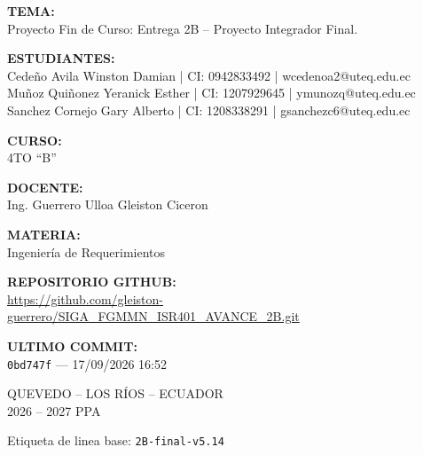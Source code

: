 \documentclass[12pt,a4paper]{article}
\begin{document}
\textbf{TEMA:}\\
Proyecto Fin de Curso: Entrega 2B -- Proyecto Integrador Final.

\bigskip
\textbf{ESTUDIANTES:}\\
Cede\~no Avila Winston Damian | CI: 0942833492 | wcedenoa2@uteq.edu.ec\\
Mu\~noz Qui\~nonez Yeranick Esther | CI: 1207929645 | ymunozq@uteq.edu.ec\\
Sanchez Cornejo Gary Alberto | CI: 1208338291 | gsanchezc6@uteq.edu.ec

\bigskip
\textbf{CURSO:}\\
4TO ``B''

\bigskip
\textbf{DOCENTE:}\\
Ing. Guerrero Ulloa Gleiston Ciceron

\bigskip
\textbf{MATERIA:}\\
Ingenier\'ia de Requerimientos

\bigskip
\textbf{REPOSITORIO GITHUB:}\\
\url{https://github.com/gleiston-guerrero/SIGA_FGMMN_ISR401_AVANCE_2B.git}

\bigskip
\textbf{ULTIMO COMMIT:}\\
\texttt{0bd747f} --- 17/09/2026 16:52

\vspace{2cm}
\begin{center}
QUEVEDO -- LOS R\'IOS -- ECUADOR\\
2026 -- 2027 PPA
\end{center}

\vspace{1cm}
Etiqueta de linea base: \texttt{2B-final-v5.14}
\end{document}
